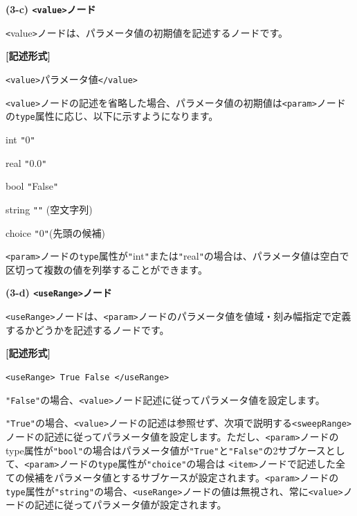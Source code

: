 \documentclass[a4paper,11pt]{jarticle}
\begin{document}
{\vspace{12pt}
\textbf{(3-c) \texttt{<value>}ノード}

\texttt{<}value\texttt{>}ノードは、パラメータ値の初期値を記述するノードです。

\vspace{8pt}
\leftskip=12pt
\textbf{[記述形式]}

\leftskip=42pt
\texttt{<value>}パラメータ値\texttt{</value>}

\vspace{8pt}
\leftskip=0pt
\texttt{<value>}ノードの記述を省略した場合、パラメータ値の初期値は\texttt{<param>}ノードの{\tt type}属性に応じ、以下に示すようになります。

\parindent=18pt
int \texttt{"}0\texttt{"}

real \texttt{"}0.0\texttt{"}

bool \texttt{"}False\texttt{"}

string \texttt{"}\texttt{"} (空文字列)

choice \texttt{"}0\texttt{"}(先頭の候補)

\parindent=0pt
\texttt{<param>}ノードの{\tt type}属性が\texttt{"}int\texttt{"}または\texttt{"}real\texttt{"}の場合は、パラメータ値は空白で区切って複数の値を列挙することができます。

\vspace{12pt}
\textbf{(3-d) \texttt{<useRange>}ノード}

\texttt{<useRange>}ノードは、\texttt{<param>}ノードのパラメータ値を値域・刻み幅指定で定義するかどうかを記述するノードです。

\vspace{8pt}
\leftskip=12pt
\textbf{[記述形式]}

\leftskip=42pt
\texttt{<useRange> True \textbar{} False </useRange>}

\vspace{8pt}
\leftskip=0pt
\texttt{"False"}の場合、\texttt{<value>}ノード記述に従ってパラメータ値を設定します。

\texttt{"True"}の場合、\texttt{<value>}ノードの記述は参照せず、次項で説明する\texttt{<sweepRange>}ノードの記述に従ってパラメータ値を設定します。ただし、\texttt{<param>}ノードのtype属性が\texttt{"bool"}の場合はパラメータ値が\texttt{"True"}と\texttt{"False"}の2サブケースとして、\texttt{<param>}ノードの{\tt type}属性が\texttt{"choice"}の場合は 
\texttt{<item>}ノードで記述した全ての候補をパラメータ値とするサブケースが設定されます。\texttt{<param>}ノードの{\tt type}属性が\texttt{"string"}の場合、\texttt{<useRange>}ノードの値は無視され、常に\texttt{<value>}ノードの記述に従ってパラメータ値が設定されます。

}
\end{document}
